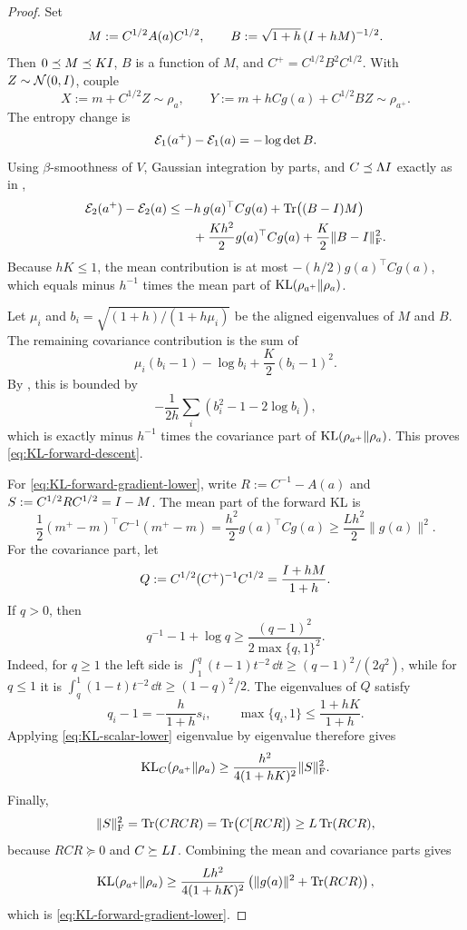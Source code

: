 \begin{proof}
Set
\[
    M:=C^{1/2}A(a)C^{1/2},
    \qquad
    B:=\sqrt{1+h}\,(I+hM)^{-1/2}.
\]
Then $0\preceq M\preceq KI$, $B$ is a function of $M$, and
$C^+=C^{1/2}B^2C^{1/2}$.  With $Z\sim\mathcal{N}(0,I)$, couple
\[
    X:=m+C^{1/2}Z\sim\rho_a,
    \qquad
    Y:=m+hCg(a)+C^{1/2}BZ\sim\rho_{a^+}.
\]
The entropy change is
\[
    \mathcal{E}_1(a^+)-\mathcal{E}_1(a)=-\log\det B.
\]
Using $\beta$-smoothness of $V$, Gaussian integration by parts, and
$C\preceq\Lambda I$ exactly as in ,
\[
\begin{aligned}
    \mathcal{E}_2(a^+)-\mathcal{E}_2(a)
    &\leq
    -h\,g(a)^\top Cg(a)
    +\operatorname{Tr}\bigl((B-I)M\bigr)\\
    &\qquad
    +\frac{Kh^2}{2}g(a)^\top Cg(a)
    +\frac K2\|B-I\|_{\mathrm{F}}^2.
\end{aligned}
\]
Because $hK\leq1$, the mean contribution is at most
$-(h/2)g(a)^\top Cg(a)$, which equals minus $h^{-1}$ times the mean part of
$\mathrm{KL}(\rho_{a^+}\|\rho_a)$.

Let $\mu_i$ and $b_i=\sqrt{(1+h)/(1+h\mu_i)}$ be the aligned eigenvalues of $M$ and $B$.
The remaining covariance contribution is the sum of
\[
    \mu_i(b_i-1)-\log b_i+\frac K2(b_i-1)^2.
\]
By , this is bounded by
\[
    -\frac1{2h}\sum_i(b_i^2-1-2\log b_i),
\]
which is exactly minus $h^{-1}$ times the covariance part of
$\mathrm{KL}(\rho_{a^+}\|\rho_a)$.  This proves \eqref{eq:KL-forward-descent}.

For \eqref{eq:KL-forward-gradient-lower}, write
$R:=C^{-1}-A(a)$ and $S:=C^{1/2}RC^{1/2}=I-M$.  The mean part of the forward KL is
\[
    \frac12(m^+-m)^\top C^{-1}(m^+-m)
    =\frac{h^2}{2}g(a)^\top Cg(a)
    \geq\frac{Lh^2}{2}\|g(a)\|^2.
\]
For the covariance part, let
\[
    Q:=C^{1/2}(C^+)^{-1}C^{1/2}=\frac{I+hM}{1+h}.
\]
If $q>0$, then
\begin{equation}
\label{eq:KL-scalar-lower}
    q^{-1}-1+\log q
    \geq
    \frac{(q-1)^2}{2\max\{q,1\}^2}.
\end{equation}
Indeed, for $q\geq1$ the left side is
$\int_1^q(t-1)t^{-2}\,\dd t\geq(q-1)^2/(2q^2)$, while for $q\leq1$ it is
$\int_q^1(1-t)t^{-2}\,\dd t\geq(1-q)^2/2$.
The eigenvalues of $Q$ satisfy
\[
    q_i-1=-\frac{h}{1+h}s_i,
    \qquad
    \max\{q_i,1\}\leq\frac{1+hK}{1+h}.
\]
Applying \eqref{eq:KL-scalar-lower} eigenvalue by eigenvalue therefore gives
\[
    \mathrm{KL}_C(\rho_{a^+}\|\rho_a)
    \geq
    \frac{h^2}{4(1+hK)^2}\|S\|_{\mathrm{F}}^2.
\]
Finally,
\[
    \|S\|_{\mathrm{F}}^2=\operatorname{Tr}(CRCR)
    =\operatorname{Tr}\bigl(C[RCR]\bigr)
    \geq L\operatorname{Tr}(RCR),
\]
because $RCR\succeq0$ and $C\succeq LI$.  Combining the mean and covariance parts gives
\[
    \mathrm{KL}(\rho_{a^+}\|\rho_a)
    \geq
    \frac{Lh^2}{4(1+hK)^2}
    \left(\|g(a)\|^2+\operatorname{Tr}(RCR)\right),
\]
which is \eqref{eq:KL-forward-gradient-lower}.
\end{proof}

